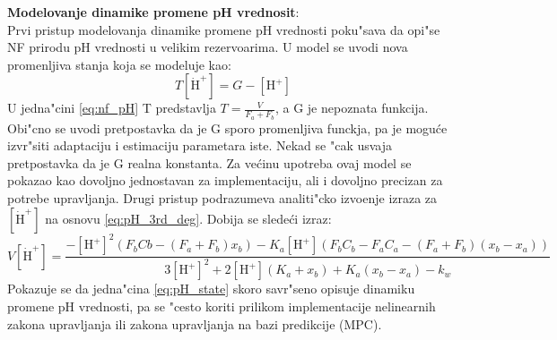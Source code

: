 \documentclass[a4paper,11pt]{article}
\theoremstyle{definition} \newtheorem{deff}{Definicija}[section]
\theoremstyle{definition} \newtheorem{prim}[deff]{Primer}
\theoremstyle{plain} \newtheorem{teor}[deff]{Teorema}
\begin{document}
	\textbf{Modelovanje dinamike promene pH vrednosit}:\\
	\noindent Prvi pristup modelovanja dinamike promene pH vrednosti poku"sava da opi"se NF prirodu pH vrednosti u velikim rezervoarima. U model se uvodi nova promenljiva stanja koja se modeluje kao:
	\begin{equation}\label{eq:nf_pH}
		T[\dot{\text{H}}^+] = G - [\text{H}^+] 
	\end{equation}
	U jedna"cini \eqref{eq:nf_pH} T predstavlja $T = \frac{V}{F_a + F_b}$, a G je nepoznata funkcija. Obi"cno se uvodi pretpostavka da je G sporo promenljiva funckja, pa je mogu\'ce izvr"siti adaptaciju i estimaciju parametara iste. Nekad se "cak usvaja pretpostavka da je G realna konstanta. Za ve\'cinu upotreba ovaj model se pokazao kao dovoljno jednostavan za implementaciju, ali i dovoljno precizan za potrebe upravljanja. Drugi pristup podrazumeva analiti"cko izvo\dj{}enje izraza za $[\dot{\text{H}}^+]$ na osnovu \eqref{eq:pH_3rd_deg}. Dobija se slede\'ci izraz:
	\begin{equation}\label{eq:pH_state}
		V[\dot{\text{H}}^+] = \frac{-[\text{H}^+]^2(F_bCb -(F_a+F_b)x_b) - K_a[\text{H}^+](F_bC_b-F_aC_a-(F_a+F_b)(x_b-x_a))}{3[\text{H}^+]^2 + 2[\text{H}^+](K_a + x_b) + K_a(x_b-x_a) - k_w}
	\end{equation}
	Pokazuje se da jedna"cina \eqref{eq:pH_state} skoro savr"seno opisuje dinamiku promene pH vrednosti, pa se "cesto koriti prilikom implementacije nelinearnih zakona upravljanja ili zakona upravljanja na bazi predikcije (MPC).\\\\\\
	
	
	
	
	
	
	
\end{document}
